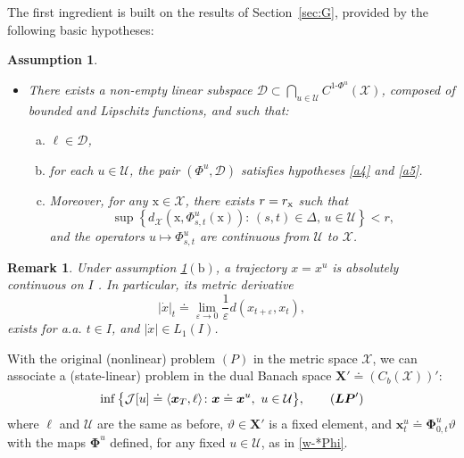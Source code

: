 \documentclass[sn-mathphys-num]{sn-jnl}
\numberwithin{equation}{section}
\theoremstyle{mythm}
\theoremstyle{mydef}
\newtheorem{remark}[proposition]{Remark}
\newtheorem{assumption}{Assumption}\renewcommand{\theassumption}{(A\arabic{assumption})}  %
\renewcommand{\epsilon}{\varepsilon}
\begin{document}
The first ingredient is built on the results of Section~\ref{sec:G}, provided by the following basic hypotheses: 
\begin{tcolorbox}
\begin{assumption}
\label{a6}
~

\begin{itemize}
\item There exists a non-empty linear subspace $\bm{\mathcal D} \subset \bigcap\limits_{u \in \mathcal U} C^{1\text{-}\Phi^u}(\mathcal X)$, composed of bounded and Lipschitz functions, and such that:
    \begin{enumerate}[(a)]
    \item \( \ell \in \bm{\mathcal D} \),
    
    \item for each \( u \in \mathcal{U} \), the pair \( (\Phi^u, \bm{\mathcal D}) \) satisfies hypotheses \ref{a4} and \ref{a5}.
    
    \item Moreover, for any \( \mathrm{x} \in \mathcal{X} \), there exists $r= r_{\rm x}$ such that $$
    \sup\left\{ d_{\mathcal X}\left(\mathrm{x}, \Phi^u_{s,t}(\mathrm{x})\right): \, (s,t) \in \Delta, \, u \in \mathcal{U} \right\}< r,$$
    and the operators \( u \mapsto \Phi^u_{s,t} \) are continuous from \( \mathcal{U} \) to \( \mathcal{X} \).
    \end{enumerate}
\end{itemize}
\end{assumption}
\end{tcolorbox}
\begin{remark}
Under assumption \ref{a6}\((\mathrm b) \), a trajectory \( x = x^{u}\) is absolutely continuous on $I$ \cite[Definition~2.1]{ambrosioGradientFlowsMetric2005}. In particular, its metric derivative \cite[Expression (2.2)]{ambrosioGradientFlowsMetric2005}
\[
|\dot x|_t \doteq \lim_{\epsilon \to 0} \frac{1}{\epsilon} d(x_{t+\epsilon}, x_t),
\]
exists for a.a. \( t \in I \), and \( |\dot x| \in L_1(I) \).
\end{remark}

With the original (nonlinear) problem $(P)$ in the metric space $\mathcal X$, we can associate a (state-linear) problem in the dual Banach space $\bm X'\doteq (C_b(\mathcal X))'$:
\[
    \inf\big\{\mathcal J[u] \doteq \langle \bm x_T, \ell \rangle\colon \bm x \doteq  \bm x^{u}, \ u \in \mathcal U\big\},\tag{${\bm{LP}}'$}
\]
where $\ell$ and $\mathcal{U}$ are the same as before, $\vartheta \in \bm X'$ is a fixed element, and $\bm x_t^{u} \doteq \bm \Phi_{0,t}^u\vartheta$ with the maps $\bm \Phi^u$ defined, for any fixed $u \in \mathcal U$, as in \eqref{w-*Phi}. 
\end{document}

